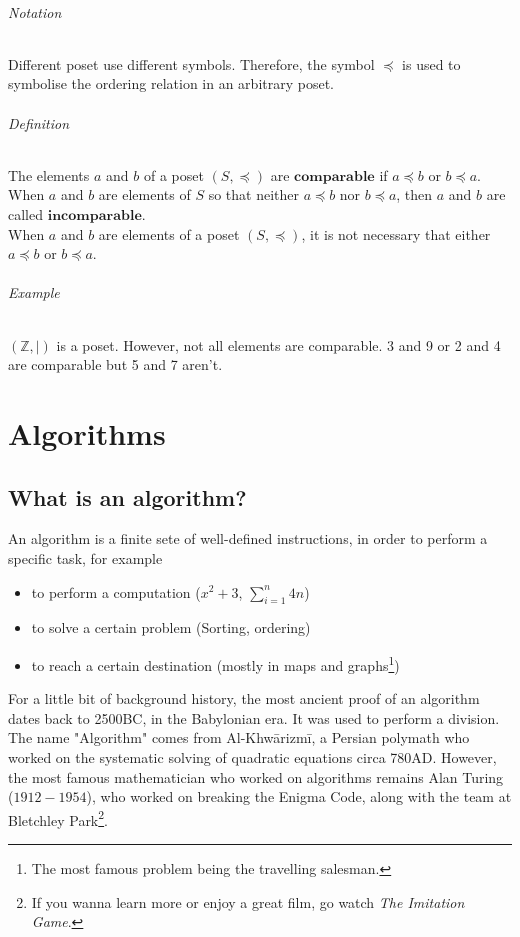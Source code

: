 \documentclass[10pt,a4paper]{book}
\begin{document}
\paragraph*{Notation}
Different poset use different symbols. Therefore, the symbol $\preceq$ is used to symbolise the ordering relation in an arbitrary poset.
\paragraph*{Definition}
The elements $a$ and $b$ of a poset $(S,\preceq)$ are $\mathbf{comparable}$ if $a \preceq b$ or $b \preceq a$.\\
When $a$ and $b$ are elements of $S$ so that neither $a \preceq b$ nor $b \preceq a$, then $a$ and $b$ are called $\mathbf{incomparable}$.\\
When $a$ and $b$ are elements of a poset $(S,\preceq)$, it is not necessary that either $a \preceq b$ or $b \preceq a$.
\paragraph*{Example}
$(\mathbb{Z},|)$ is a poset. However, not all elements are comparable. 3 and 9 or 2 and 4 are comparable but 5 and 7 aren't.

\part{Algorithms}

\chapter{What is an algorithm?}
An algorithm is a finite sete of well-defined instructions, in order to perform a specific task, for example
\begin{itemize}
\item to perform a computation ($x^2 + 3$, $\sum_{i=1}^{n} 4n$)
\item to solve a certain problem (Sorting, ordering)
\item to reach a certain destination (mostly in maps and graphs\footnote{The most famous problem being the travelling salesman.})
\end{itemize}
For a little bit of background history, the most ancient proof of an algorithm dates back to 2500BC, in the Babylonian era. It was used to perform a division. The name "Algorithm" comes from Al-Khwārizmī, a Persian polymath who worked on the systematic solving of quadratic equations circa 780AD. However, the most famous mathematician who worked on algorithms remains Alan Turing ($1912-1954$), who worked on breaking the Enigma Code, along with the team at Bletchley Park\footnote{If you wanna learn more or enjoy a great film, go watch \textit{The Imitation Game}.}.
\end{document}
